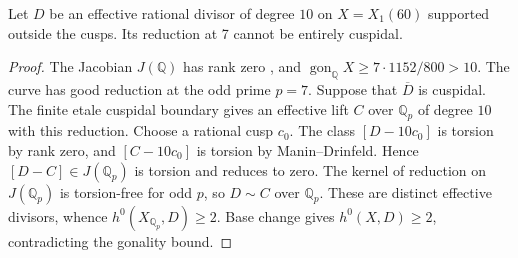 \begin{lemma}
Let $D$ be an effective rational divisor of degree $10$ on
$X=X_1(60)$ supported outside the cusps.
Its reduction at 7 cannot be entirely cuspidal.
\end{lemma}
\begin{proof}
The Jacobian $J(\mathbb Q)$ has rank zero
\cite[Theorem~3.1(2)]{DEHMZ}, and $\operatorname{gon}_{\mathbb Q}X\geq 7\cdot1152/800>10$.
The curve has good reduction at the odd prime $p=7$.
Suppose that $\overline D$ is cuspidal. The finite etale cuspidal
boundary gives an effective lift $C$ over $\mathbb Q_p$ of degree
$10$ with this reduction. Choose a rational cusp $c_0$.
The class $[D-10c_0]$ is torsion by rank zero, and
$[C-10c_0]$ is torsion by Manin--Drinfeld. Hence
$[D-C]\in J(\mathbb Q_p)$ is torsion and reduces to zero.
The kernel of reduction on $J(\mathbb Q_p)$ is torsion-free
for odd $p$, so $D\sim C$ over $\mathbb Q_p$.
These are distinct effective divisors, whence
$h^0(X_{\mathbb Q_p},D)\geq2$. Base change gives
$h^0(X,D)\geq2$, contradicting the gonality bound.
\end{proof}
